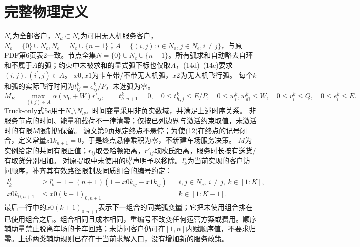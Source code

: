\documentclass[11pt]{ctexart}
\begin{document}
\section*{完整物理定义}
$N_c$为全部客户，$N_d\subset N_c$为可用无人机服务客户，
$N_o=\{0\}\cup N_c,N_e=N_c\cup\{n+1\}$；$A=\{(i,j):i\in N_o,j\in N_e,i\ne j\}$，与原PDF第6页表2一致。节点全集$N=\{0\}\cup N_c\cup\{n+1\}$。所有弧求和自动略去自环和不属于$A$的弧；约束中未被求和的显式弧下标也仅取$A$，(14d)--(14e)要求$(i,j),(i^{\prime},j)\in A$。
$x0,x1$为卡车带/不带无人机弧，$x2$为无人机飞行弧。
每个$k$和弧的实际飞行时间为$t^k_{ij}=e^k_{ij}/P$，未选弧为零。
\[
M_E=\max_{(i,j)\in A}\alpha(w_0+W)r'_{ij},\qquad
t^k_{h,n+1}=0,\quad
0\le t^k_{h,j}\le E/P,\quad0\le w_i^k,w_{di}^k\le W,\quad0\le v_i^k\le Q,\quad0\le e_i^k\le E.
\]
Truck-only式5c用于$N_c\setminus N_d$。时间变量采用非负实数域，并满足上述时序关系。
非服务节点的时间、能量和载荷不一律清零；仅按已列边界与激活约束取值，未激活时的有限$M$限制仍保留。
源文第9页规定终点不悬停；为使(12)在终点的记号闭合，定义常量$z1k_{n+1}=0$，于是终点悬停乘积为零，不新建车场服务决策。
$M$为实例给定的共同有限正值；$r_{ij}$取曼哈顿距离，$r'_{ij}$取欧氏距离，服务时长按有送货/有取货分别相加。
对原提取中未使用的$b_k^{ij}$声明予以移除。$l_k^i$为当前实现的客户访问顺序，补齐其有效路径限制及同质组合的编号约定：
\begin{align*}
 l_k^j&\ge l_k^i+1-(n+1)(1-x0k_{ij}-x1k_{ij})
 &&i,j\in N_c,\ i\ne j,\ k\in[1:K],\\
 x0k_{0,n+1}&\le x0(k+1)_{0,n+1} && k\in[1:K-1].
\end{align*}
最后一行中的$x0(k+1)_{0,n+1}$表示下一组合的同类弧变量；它把未使用组合排在已使用组合之后。组合相同且成本相同，重编号不改变任何运营方案或费用。顺序辅助量禁止脱离车场的卡车回路；未访问客户仍可在$[1,n]$内赋顺序值，不要求归零。上述两类辅助规则已存在于当前求解入口，没有增加新的服务政策。
\end{document}
